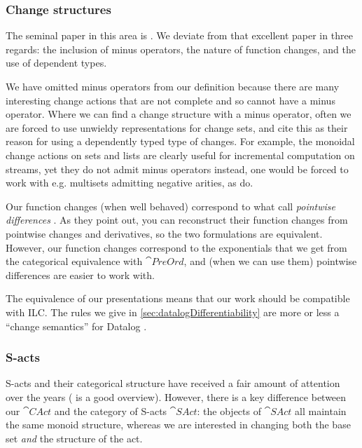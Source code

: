 \subsubsection{Change structures}
\label{sec:relatedChangeStructures}

The seminal paper in this area is \textcite{cai2014changes}. We deviate from
that excellent paper in three regards: the
inclusion of minus operators, the nature of function changes, and the use of
dependent types.

We have omitted minus operators from our definition because
there are many interesting change actions that are not complete and so cannot
have a minus operator. Where we can find a change structure with a minus operator, often we are
forced to use unwieldy representations for change sets, and
\citeauthor{cai2014changes} cite this as their reason for using a dependently
typed type of changes. For example, the monoidal change actions on sets and lists are clearly
useful for incremental computation on streams, yet they do not admit minus operators \textemdash instead, one would
be forced to work with e.g. multisets admitting negative arities, as \citeauthor{cai2014changes} do.

Our function changes (when well behaved) correspond to what \citeauthor{cai2014changes} call
\emph{pointwise differences} \autocite[See][section 2.2]{cai2014changes}. As they point out, you can reconstruct their
function changes from pointwise changes and derivatives, so the two formulations
are equivalent. However, our function changes correspond to the
exponentials that we get from the categorical equivalence with $\cat{PreOrd}$,
and (when we can use them) pointwise differences are easier to work with.

The equivalence of our presentations means that our work should be compatible
with ILC. The rules we give in \cref{sec:datalogDifferentiability} are more or
less a ``change semantics'' for Datalog \autocite[See][section
3.5]{cai2014changes}. 

\subsubsection{S-acts}

S-acts and their categorical structure have received a fair amount of attention
over the years (\textcite{kilp2000monoids} is a good
overview). However, there is a key difference between our $\cat{CAct}$ and the category of
S-acts $\cat{SAct}$: the objects of $\cat{SAct}$ all maintain the same monoid
structure, whereas we are interested in changing both the base set \emph{and} the structure of the act.

